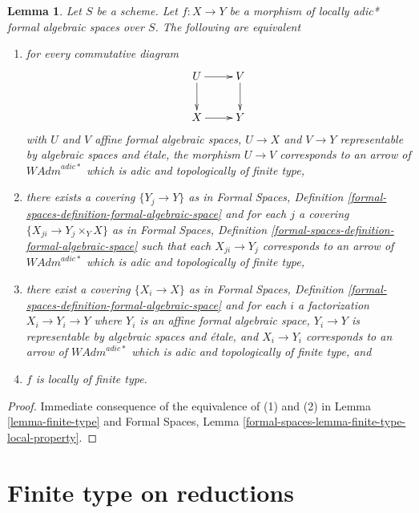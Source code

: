 \documentclass{stacks-project}
\theoremstyle{plain}
\newtheorem{lemma}[subsection]{Lemma}
\theoremstyle{definition}
\theoremstyle{remark}
\numberwithin{equation}{subsection}
\begin{document}
\begin{lemma}
\label{lemma-finite-type-morphisms}
Let $S$ be a scheme. Let $f : X \to Y$ be a morphism of
locally adic* formal algebraic spaces over $S$.
The following are equivalent
\begin{enumerate}
\item for every commutative diagram
$$
\xymatrix{
U \ar[d] \ar[r] & V \ar[d] \\
X \ar[r] & Y
}
$$
with $U$ and $V$ affine formal algebraic spaces, $U \to X$ and $V \to Y$
representable by algebraic spaces and \'etale, the morphism $U \to V$
corresponds to an arrow of $\textit{WAdm}^{adic*}$ which is
adic and topologically of finite type,
\item there exists a covering $\{Y_j \to Y\}$ as in
Formal Spaces,
Definition \ref{formal-spaces-definition-formal-algebraic-space}
and for each $j$
a covering $\{X_{ji} \to Y_j \times_Y X\}$ as in
Formal Spaces,
Definition \ref{formal-spaces-definition-formal-algebraic-space}
such that each $X_{ji} \to Y_j$  corresponds
to an arrow of $\textit{WAdm}^{adic*}$ which is adic and
topologically of finite type,
\item there exist a covering $\{X_i \to X\}$ as in
Formal Spaces,
Definition \ref{formal-spaces-definition-formal-algebraic-space}
and for each $i$ a factorization $X_i \to Y_i \to Y$ where $Y_i$
is an affine formal algebraic space, $Y_i \to Y$ is representable
by algebraic spaces and \'etale, and $X_i \to Y_i$ corresponds
to an arrow of $\textit{WAdm}^{adic*}$ which is adic and topologically
of finite type, and
\item $f$ is locally of finite type.
\end{enumerate}
\end{lemma}

\begin{proof}
Immediate consequence of the equivalence of (1) and (2) in
Lemma \ref{lemma-finite-type} and
Formal Spaces, Lemma
\ref{formal-spaces-lemma-finite-type-local-property}.
\end{proof}










\section{Finite type on reductions}
\label{section-finite-type-red}
\end{document}

